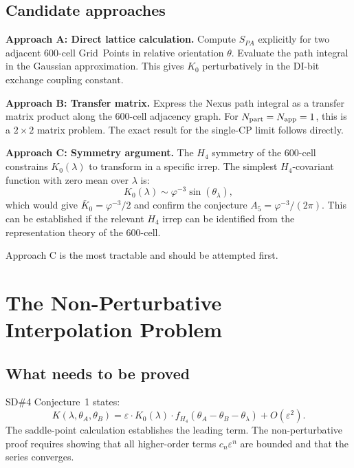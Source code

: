 \documentclass[11pt,a4paper]{article}
\newcommand{\phig}{\varphi}
\newcommand{\eps}{\varepsilon}
\begin{document}
\subsection{Candidate approaches}

\textbf{Approach A: Direct lattice calculation.}
Compute $S_{PA}$ explicitly for two adjacent 600-cell Grid~Points
in relative orientation $\theta$.  Evaluate the path integral in
the Gaussian approximation.  This gives $K_0$ perturbatively in
the DI-bit exchange coupling constant.

\textbf{Approach B: Transfer matrix.}
Express the Nexus path integral as a transfer matrix product
along the 600-cell adjacency graph.  For $N_{\rm part} = N_{\rm
app} = 1$, this is a $2 \times 2$ matrix problem.  The exact
result for the single-CP limit follows directly.

\textbf{Approach C: Symmetry argument.}
The $H_4$ symmetry of the 600-cell constrains $K_0(\lambda)$ to
transform in a specific irrep.  The simplest $H_4$-covariant
function with zero mean over $\lambda$ is:
\begin{equation}
K_0(\lambda) \sim \phig^{-3} \sin(\theta_\lambda),
\label{eq:K0_conjecture_form}
\end{equation}
which would give $\bar K_0 = \phig^{-3}/2$ and confirm the
conjecture $A_5 = \phig^{-3}/(2\pi)$.  This can be established
if the relevant $H_4$ irrep can be identified from the
representation theory of the 600-cell.

Approach C is the most tractable and should be attempted first.

\section{The Non-Perturbative Interpolation Problem}

\subsection{What needs to be proved}

SD\#4 Conjecture~1 states:
\begin{equation}
K(\lambda,\theta_A,\theta_B)
= \eps \cdot K_0(\lambda) \cdot f_{H_4}(\theta_A-\theta_B-\theta_\lambda)
+ O(\eps^2).
\label{eq:conj}
\end{equation}
The saddle-point calculation establishes the leading term.
The non-perturbative proof requires showing that all higher-order
terms $c_n \eps^n$ are bounded and that the series converges.
\end{document}
